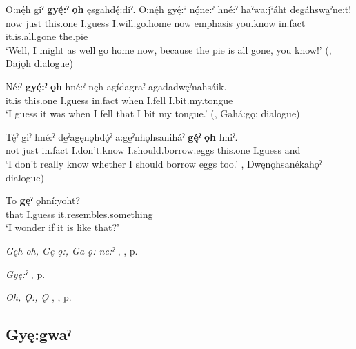 \ea
\label{ex:gpar125}
\gll O:nę́h giˀ \textbf{gyę́:ˀ} \textbf{ǫh} ęsgahdę́:diˀ. O:nę́h gyę́:ˀ nǫ́ne:ˀ hné:ˀ haˀwa:jˀáht degáhswa̱ˀne:t!\\
now just this.one I.guess I.will.go.home now emphasis you.know in.fact it.is.all.gone the.pie\\
\glt ‘Well, I might as well go home now, because the pie is all gone, you know!’ (\cite[376]{mithun_watewayestanih_1984}, Dajǫh dialogue)
\z

\ea
\label{ex:gpar126}
\gll Né:ˀ \textbf{gyę́:ˀ} \textbf{ǫh} hné:ˀ nęh agídagraˀ agadadwęˀna̱hsáik.\\
it.is this.one I.guess in.fact when I.fell I.bit.my.tongue\\
\glt ‘I guess it was when I fell that I bit my tongue.’ (\cite[386]{mithun_watewayestanih_1984}, Ga̱há:gǫ: dialogue)
\z

\ea
\label{ex:gpar127}
\gll Tę́ˀ giˀ hné:ˀ de̱ˀagęnǫhdǫ́ˀ a:ge̱ˀnhǫhsaniháˀ \textbf{gę́ˀ} \textbf{ǫh} hniˀ.\\
not just in.fact I.don’t.know I.should.borrow.eggs this.one I.guess and\\
\glt ‘I don’t really know whether I should borrow eggs too.’ \cite[441]{mithun_watewayestanih_1984}, Dwęnǫhsanékahǫˀ dialogue)
\z

\ea
\label{ex:gpar128}
\gll To \textbf{gęˀ} ǫhní:yoht?\\
that I.guess it.resembles.something\\
\glt ‘I wonder if it is like that?’
\z

\begin{CayugaRelated}
\item \textit{Gęh oh, Gę-ǫ:, Ga-ǫ: ne:ˀ} , , p. \pageref{p:[gęh oh, gę-ǫ:]}\\
\item \textit{Gyę:ˀ} , p. \pageref{p:[gyę:ˀ]}\\
\item \textit{Oh, Ǫ:, Ǫ} , , p. \pageref{p:[ǫh, ǫ:, ǫ]}
\end{CayugaRelated}


\subsection*{\textbf{Gyę:gwaˀ} } \label{p:[gyę:gwaˀ]}

